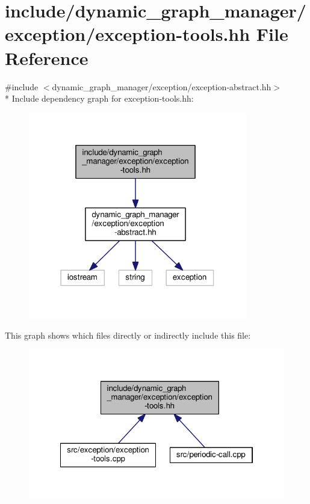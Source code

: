 \hypertarget{exception-tools_8hh}{}\section{include/dynamic\+\_\+graph\+\_\+manager/exception/exception-\/tools.hh File Reference}
\label{exception-tools_8hh}
{\ttfamily \#include $<$dynamic\+\_\+graph\+\_\+manager/exception/exception-\/abstract.\+hh$>$}\\*
Include dependency graph for exception-\/tools.hh\+:
\nopagebreak
\begin{figure}[H]
\begin{center}
\leavevmode
\includegraphics[width=271pt]{exception-tools_8hh__incl}
\end{center}
\end{figure}
This graph shows which files directly or indirectly include this file\+:
\nopagebreak
\begin{figure}[H]
\begin{center}
\leavevmode
\includegraphics[width=322pt]{exception-tools_8hh__dep__incl}
\end{center}
\end{figure}
